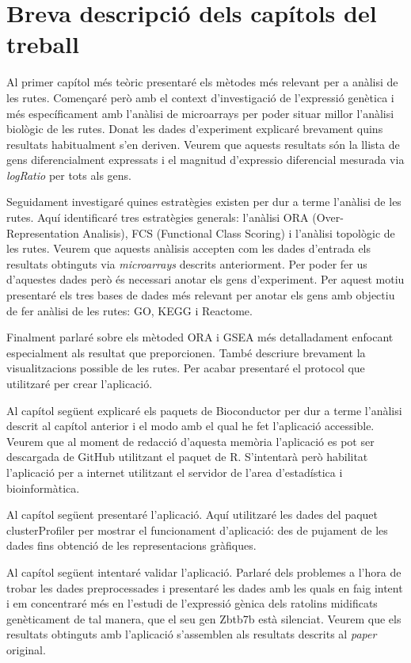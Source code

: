 \section{Breva descripció dels capítols del treball}

Al primer capítol més teòric presentaré els mètodes més relevant per a anàlisi de les rutes. Començaré però amb el context d'investigació de l'expressió genètica i més específicament amb l'anàlisi de microarrays per poder situar millor l'anàlisi biològic de les rutes. Donat les dades d'experiment explicaré brevament quins resultats habitualment s'en deriven. Veurem que aquests resultats són la llista de gens diferencialment expressats i el magnitud d'expressio diferencial mesurada via \textit{logRatio} per tots als gens. 

Seguidament investigaré quines estratègies existen per dur a terme l'anàlisi de les rutes. Aquí identificaré tres estratègies generals: l'anàlisi \Gls{ORA} (Over-Representation Analisis), FCS (Functional Class Scoring) i l'anàlisi topològic de les rutes. Veurem que aquests anàlisis accepten com les dades d'entrada els resultats obtinguts via \textit{microarrays} descrits anteriorment. Per poder fer us d'aquestes dades però és necessari anotar els gens d'experiment. Per aquest motiu presentaré els tres bases de dades més relevant per anotar els gens amb objectiu de fer anàlisi de les rutes: GO, KEGG i Reactome.

Finalment parlaré sobre els mètoded ORA i GSEA més detalladament enfocant especialment als resultat que preporcionen. També descriure brevament la visualitzacions possible de les rutes. Per acabar presentaré el protocol que utilitzaré per crear l'aplicació.

Al capítol següent explicaré els paquets de Bioconductor per dur a terme l'anàlisi descrit al capítol anterior i el modo amb el qual he fet l'aplicació accessible. Veurem que al moment de redacció d'aquesta memòria l'aplicació es pot ser descargada de GitHub utilitzant el paquet  de R. S'intentarà però habilitat l'aplicació  per a internet utilitzant el servidor de l'area d'estadística i bioinformàtica. 

Al capítol següent presentaré l'aplicació. Aquí utilitzaré les dades del paquet clusterProfiler per mostrar el funcionament d'aplicació: des de pujament de les dades fins obtenció de les representacions gràfiques.

Al capítol següent intentaré validar l'aplicació. Parlaré dels problemes a l'hora de trobar les dades preprocessades i presentaré les dades amb les quals en faig intent i em concentraré més en l'estudi de l'expressió gènica dels ratolins midificats genèticament de tal manera, que el seu gen  Zbtb7b està silenciat. Veurem que els resultats obtinguts amb l'aplicació s'assemblen als resultats descrits al \textit{paper} original. 

